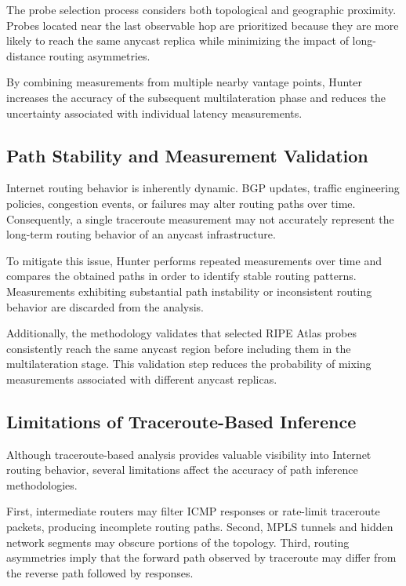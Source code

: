 The probe selection process considers both topological and geographic proximity. Probes located near the last observable hop are prioritized because they are more likely to reach the same anycast replica while minimizing the impact of long-distance routing asymmetries.

By combining measurements from multiple nearby vantage points, Hunter increases the accuracy of the subsequent multilateration phase and reduces the uncertainty associated with individual latency measurements.

\subsection{Path Stability and Measurement Validation}

Internet routing behavior is inherently dynamic. BGP updates, traffic engineering policies, congestion events, or failures may alter routing paths over time. Consequently, a single traceroute measurement may not accurately represent the long-term routing behavior of an anycast infrastructure.

To mitigate this issue, Hunter performs repeated measurements over time and compares the obtained paths in order to identify stable routing patterns. Measurements exhibiting substantial path instability or inconsistent routing behavior are discarded from the analysis.

Additionally, the methodology validates that selected RIPE Atlas probes consistently reach the same anycast region before including them in the multilateration stage. This validation step reduces the probability of mixing measurements associated with different anycast replicas.

\subsection{Limitations of Traceroute-Based Inference}

Although traceroute-based analysis provides valuable visibility into Internet routing behavior, several limitations affect the accuracy of path inference methodologies.

First, intermediate routers may filter ICMP responses or rate-limit traceroute packets, producing incomplete routing paths. Second, MPLS tunnels and hidden network segments may obscure portions of the topology. Third, routing asymmetries imply that the forward path observed by traceroute may differ from the reverse path followed by responses.


